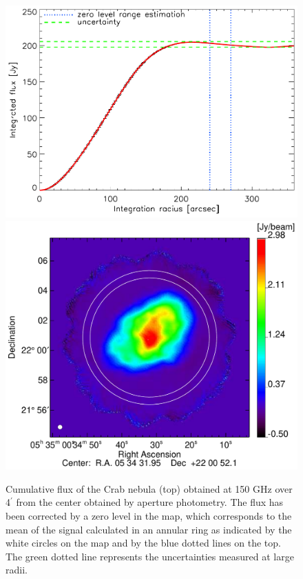 \documentclass[twocolumn,traditabstract]{aa}
\begin{document}
\begin{figure}[h!]
  \centering
  \includegraphics[width=0.7\linewidth,keepaspectratio]{figures/Crab_integrated_flux_2mm.pdf}
  \includegraphics[width=0.8\linewidth,keepaspectratio]{figures/Crab_I_v3_2mm_ring.pdf}
     \caption{
       Cumulative flux of the Crab nebula (top) obtained at 150 GHz over
       4$^{\prime}$ from the center obtained by aperture photometry. The flux
       has been corrected by a zero level in the map, which corresponds to the
       mean of the signal calculated in an annular ring as indicated by the
       white circles on the map and by the blue dotted lines on the
       top. The green dotted line represents the uncertainties measured at large
       radii.}
\label{crab_integrated_flux}
\end{figure}
\end{document}
